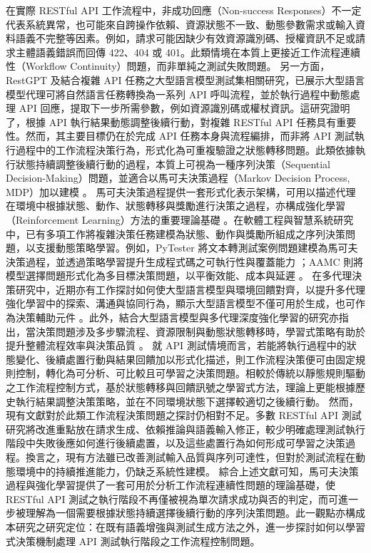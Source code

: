 \begin{ZhChapter}
\text 在實際 RESTful API 工作流程中，非成功回應（Non-success Responses）不一定代表系統異常，也可能來自跨操作依賴、資源狀態不一致、動態參數需求或輸入資料語義不完整等因素。例如，請求可能因缺少有效資源識別碼、授權資訊不足或請求主體語義錯誤而回傳 422、404 或 401。此類情境在本質上更接近工作流程連續性（Workflow Continuity）問題，而非單純之測試失敗問題。
\text 另一方面，RestGPT\parencite{Song2023RestGPT} 及結合複雜 API 任務之大型語言模型測試集相關研究，已展示大型語言模型代理可將自然語言任務轉換為一系列 API 呼叫流程，並於執行過程中動態處理 API 回應，提取下一步所需參數，例如資源識別碼或權杖資訊。這研究證明了，根據 API 執行結果動態調整後續行動，對複雜 RESTful API 任務具有重要性。然而，其主要目標仍在於完成 API 任務本身與流程編排，而非將 API 測試執行過程中的工作流程決策行為，形式化為可重複驗證之狀態轉移問題。此類依據執行狀態持續調整後續行動的過程，本質上可視為一種序列決策（Sequential Decision-Making）問題，並適合以馬可夫決策過程（Markov Decision Process, MDP）加以建模 \parencite{rao2022foundations}。
\text 馬可夫決策過程提供一套形式化表示架構，可用以描述代理在環境中根據狀態、動作、狀態轉移與獎勵進行決策之過程，亦構成強化學習（Reinforcement Learning）方法的重要理論基礎 \parencite{rao2022foundations}。在軟體工程與智慧系統研究中，已有多項工作將複雜決策任務建模為狀態、動作與獎勵所組成之序列決策問題，以支援動態策略學習。例如，PyTester 將文本轉測試案例問題建模為馬可夫決策過程，並透過策略學習提升生成程式碼之可執行性與覆蓋能力 \parencite{Takerngsaksiri2025Pytester}；AAMC 則將模型選擇問題形式化為多目標決策問題，以平衡效能、成本與延遲 \parencite{Rjoub2026Adaptive}。
\text 在多代理決策研究中，近期亦有工作探討如何使大型語言模型與環境回饋對齊，以提升多代理強化學習中的探索、溝通與協同行為，顯示大型語言模型不僅可用於生成，也可作為決策輔助元件 \parencite{Zhang2026EALLMs}。此外，結合大型語言模型與多代理深度強化學習的研究亦指出，當決策問題涉及多步驟流程、資源限制與動態狀態轉移時，學習式策略有助於提升整體流程效率與決策品質 \parencite{Gu2026Large}。
\text 就 API 測試情境而言，若能將執行過程中的狀態變化、後續處置行動與結果回饋加以形式化描述，則工作流程決策便可由固定規則控制，轉化為可分析、可比較且可學習之決策問題。相較於傳統以靜態規則驅動之工作流程控制方式，基於狀態轉移與回饋訊號之學習式方法，理論上更能根據歷史執行結果調整決策策略，並在不同環境狀態下選擇較適切之後續行動。
\text 然而，現有文獻對於此類工作流程決策問題之探討仍相對不足。多數 RESTful API 測試研究將改進重點放在請求生成、依賴推論與語義輸入修正，較少明確處理測試執行階段中失敗後應如何進行後續處置，以及這些處置行為如何形成可學習之決策過程。換言之，現有方法雖已改善測試輸入品質與序列可達性，但對於測試流程在動態環境中的持續推進能力，仍缺乏系統性建模。
\text 綜合上述文獻可知，馬可夫決策過程與強化學習提供了一套可用於分析工作流程連續性問題的理論基礎，使 RESTful API 測試之執行階段不再僅被視為單次請求成功與否的判定，而可進一步被理解為一個需要根據狀態持續選擇後續行動的序列決策問題。此一觀點亦構成本研究之研究定位：在既有語義增強與測試生成方法之外，進一步探討如何以學習式決策機制處理 API 測試執行階段之工作流程控制問題。


\end{ZhChapter}
